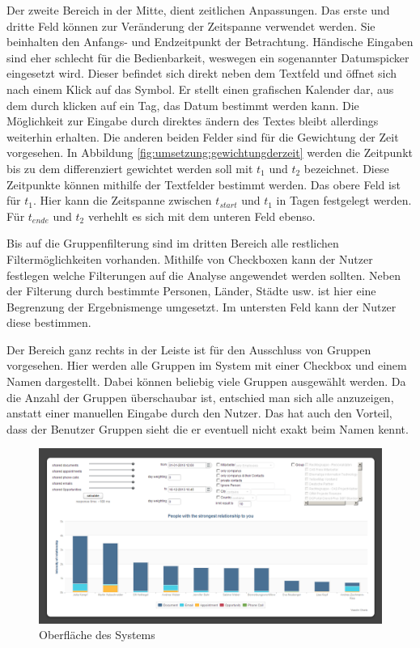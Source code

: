 Der zweite Bereich in der Mitte, dient zeitlichen Anpassungen. Das erste und dritte Feld können zur Veränderung der Zeitspanne verwendet werden. Sie beinhalten den Anfangs- und Endzeitpunkt der Betrachtung. Händische Eingaben sind eher schlecht für die Bedienbarkeit, weswegen ein sogenannter Datumspicker eingesetzt wird. Dieser befindet sich direkt neben dem Textfeld und öffnet sich nach einem Klick auf das Symbol. Er stellt einen grafischen Kalender dar, aus dem durch klicken auf ein Tag, das Datum bestimmt werden kann. Die Möglichkeit zur Eingabe durch direktes ändern des Textes bleibt allerdings weiterhin erhalten. Die anderen beiden Felder sind für die Gewichtung der Zeit vorgesehen. In Abbildung \ref{fig:umsetzung:gewichtungderzeit} werden die Zeitpunkt bis zu dem differenziert gewichtet werden soll mit $t_1$ und $t_2$ bezeichnet. Diese Zeitpunkte können mithilfe der Textfelder bestimmt werden. Das obere Feld ist für $t_1$. Hier kann die Zeitspanne zwischen $t_{start}$ und $t_1$ in Tagen festgelegt werden. Für $t_{ende}$ und $t_2$ verhehlt es sich mit dem unteren Feld ebenso.

Bis auf die Gruppenfilterung sind im dritten Bereich alle restlichen Filtermöglichkeiten vorhanden. Mithilfe von Checkboxen kann der Nutzer festlegen welche Filterungen auf die Analyse angewendet werden sollten. Neben der Filterung durch bestimmte Personen, Länder, Städte usw. ist hier eine Begrenzung der Ergebnismenge umgesetzt. Im untersten Feld kann der Nutzer diese bestimmen.

Der Bereich ganz rechts in der Leiste ist für den Ausschluss von Gruppen vorgesehen. Hier werden alle Gruppen im System mit einer Checkbox und einem Namen dargestellt. Dabei können beliebig viele Gruppen ausgewählt werden. Da die Anzahl der Gruppen überschaubar ist, entschied man sich alle anzuzeigen, anstatt einer manuellen Eingabe durch den Nutzer. Das hat auch den Vorteil, dass der Benutzer Gruppen sieht die er eventuell nicht exakt beim Namen kennt.     

\begin{figure}[htbp]
\centering
\includegraphics[width=\textwidth]{pics/final_screen.png}
\caption{Oberfläche des Systems}
\label{ergebniss_oberflaeche_haupt}
\end{figure}

